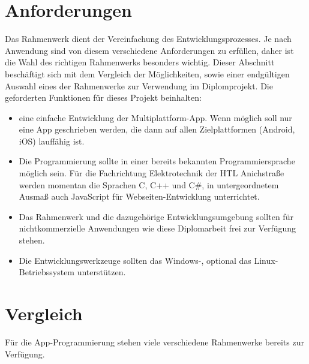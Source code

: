 \section{Anforderungen}
Das Rahmenwerk dient der Vereinfachung des Entwicklungsprozesses.
Je nach Anwendung sind von diesem verschiedene Anforderungen zu erfüllen, daher ist die Wahl des richtigen Rahmenwerks besonders wichtig.
Dieser Abschnitt beschäftigt sich mit dem Vergleich der Möglichkeiten, sowie einer endgültigen Auswahl eines der Rahmenwerke zur Verwendung im Diplomprojekt.
Die geforderten Funktionen für dieses Projekt beinhalten:
\begin{itemize}
    \item eine einfache Entwicklung der Multiplattform-App. Wenn möglich soll nur eine App geschrieben werden, die dann auf allen Zielplattformen (Android, iOS) lauffähig ist.
    \item Die Programmierung sollte in einer bereits bekannten Programmiersprache möglich sein.
    Für die Fachrichtung Elektrotechnik der HTL Anichstraße werden momentan die Sprachen C, C++ und C\#, in untergeordnetem Ausmaß auch JavaScript für Webseiten-Entwicklung unterrichtet.
    \item Das Rahmenwerk und die dazugehörige Entwicklungsumgebung sollten für nichtkommerzielle Anwendungen wie diese Diplomarbeit frei zur Verfügung stehen.
    \item Die Entwicklungswerkzeuge sollten das Windows-, optional das Linux-Betriebs\-sys\-tem unterstützen.
\end{itemize}

\section{Vergleich}
Für die App-Programmierung stehen viele verschiedene Rahmenwerke bereits zur Verfügung.
